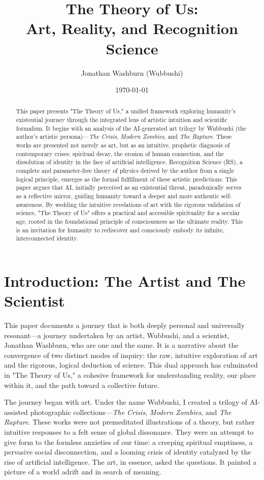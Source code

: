 \documentclass[12pt]{article}
\title{The Theory of Us: \\ Art, Reality, and Recognition Science}
\author{Jonathan Washburn (Wubbushi)}
\date{\today}
\begin{document}
\maketitle

\begin{abstract}
This paper presents "The Theory of Us," a unified framework exploring humanity's existential journey through the integrated lens of artistic intuition and scientific formalism. It begins with an analysis of the AI-generated art trilogy by Wubbushi (the author's artistic persona)—\textit{The Crisis}, \textit{Modern Zombies}, and \textit{The Rapture}. These works are presented not merely as art, but as an intuitive, prophetic diagnosis of contemporary crises: spiritual decay, the erosion of human connection, and the dissolution of identity in the face of artificial intelligence. Recognition Science (RS), a complete and parameter-free theory of physics derived by the author from a single logical principle, emerges as the formal fulfillment of these artistic predictions. This paper argues that AI, initially perceived as an existential threat, paradoxically serves as a reflective mirror, guiding humanity toward a deeper and more authentic self-awareness. By wedding the intuitive revelations of art with the rigorous validation of science, "The Theory of Us" offers a practical and accessible spirituality for a secular age, rooted in the foundational principle of consciousness as the ultimate reality. This is an invitation for humanity to rediscover and consciously embody its infinite, interconnected identity.
\end{abstract}

\section{Introduction: The Artist and The Scientist}

This paper documents a journey that is both deeply personal and universally resonant—a journey undertaken by an artist, Wubbushi, and a scientist, Jonathan Washburn, who are one and the same. It is a narrative about the convergence of two distinct modes of inquiry: the raw, intuitive exploration of art and the rigorous, logical deduction of science. This dual approach has culminated in "The Theory of Us," a cohesive framework for understanding reality, our place within it, and the path toward a collective future.

The journey began with art. Under the name Wubbushi, I created a trilogy of AI-assisted photographic collections—\textit{The Crisis}, \textit{Modern Zombies}, and \textit{The Rapture}. These works were not premeditated illustrations of a theory, but rather intuitive responses to a felt sense of global dissonance. They were an attempt to give form to the formless anxieties of our time: a creeping spiritual emptiness, a pervasive social disconnection, and a looming crisis of identity catalyzed by the rise of artificial intelligence. The art, in essence, asked the questions. It painted a picture of a world adrift and in search of meaning.
\end{document}
